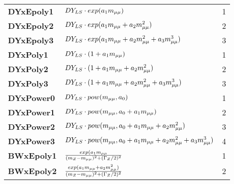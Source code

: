 \documentclass[xcolor={x11names}]{beamer}
\begin{document}
\begin{frame}[fragile,shrink=25]
\begin{table}
{\begin{tabular}{l l c}
\textbf{DYxEpoly1}      &    $DY\sb {LS}\cdot exp(a\sb 1 m\sb {\mu\mu})                                                                                        $   &   1       \\
\textbf{DYxEpoly2}      &    $DY\sb {LS}\cdot exp(a\sb 1 m\sb {\mu\mu} + a\sb 2m\sb {\mu\mu}^2)                                                                      $   &   2       \\
\textbf{DYxEpoly3}      &    $DY\sb {LS}\cdot exp(a\sb 1 m\sb {\mu\mu} + a\sb 2m\sb {\mu\mu}^2 + a\sb 3m\sb {\mu\mu}^3)                                                    $   &   3       \\
\textbf{DYxPoly1 }      &    $DY\sb {LS}\cdot(1+a\sb 1 m\sb {\mu\mu})                                                                                          $   &   1       \\
\textbf{DYxPoly2 }      &    $DY\sb {LS}\cdot(1+a\sb 1 m\sb {\mu\mu} + a\sb 2m\sb {\mu\mu}^2)                                                                        $   &   2       \\
\textbf{DYxPoly3 }      &    $DY\sb {LS}\cdot(1+a\sb 1 m\sb {\mu\mu} + a\sb 2m\sb {\mu\mu}^2 + a\sb 3m\sb {\mu\mu}^3)                                                      $   &   3       \\
\textbf{DYxPower0}      &    $DY\sb {LS}\cdot pow(m\sb {\mu\mu}, a\sb 0)                                                                                       $   &   1       \\
\textbf{DYxPower1}      &    $DY\sb {LS}\cdot pow(m\sb {\mu\mu}, a\sb 0 + a\sb 1 m\sb {\mu\mu})                                                                      $   &   2       \\
\textbf{DYxPower2}      &    $DY\sb {LS}\cdot pow(m\sb {\mu\mu}, a\sb 0 + a\sb 1 m\sb {\mu\mu}+a\sb 2 m\sb {\mu\mu}^2 )                                                    $   &   3       \\
\textbf{DYxPower3}      &    $DY\sb {LS}\cdot pow(m\sb {\mu\mu}, a\sb 0 + a\sb 1 m\sb {\mu\mu}+a\sb 2 m\sb {\mu\mu}^2+a\sb 3 m\sb {\mu\mu}^3 )                                   $   &   4       \\
\textbf{BWxEpoly1}      &    $\frac{exp(a\sb 1 m\sb {\mu\mu}}{(m\sb Z -m\sb {\mu\mu})^2 + (\Gamma\sb Z/2)^2}                                                         $   &   1       \\
\textbf{BWxEpoly2}      &    $\frac{exp(a\sb 1 m\sb {\mu\mu} + a\sb 2m\sb {\mu\mu}^2)}{(m\sb Z -m\sb {\mu\mu})^2 + (\Gamma\sb Z/2)^2}                                      $   &   2       \\

\end{tabular}}
\end{table}
\end{frame}
\end{document}
